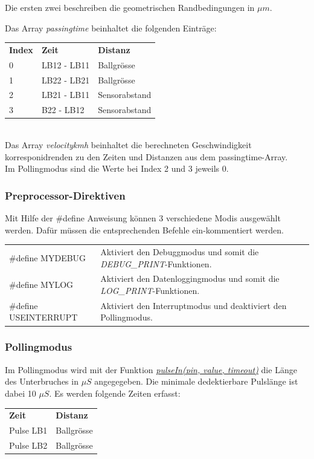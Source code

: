Die ersten zwei beschreiben die geometrischen Randbedingungen in $\mu m$.\\
\clearpage

Das Array \textit{passingtime} beinhaltet die folgenden Einträge:\\
\begin{tabular}{lll}
    \textbf{Index}&\textbf{Zeit} & \textbf{Distanz} \\
    0&LB12 - LB11 & Ballgrösse\\
    1&LB22 - LB21 & Ballgrösse\\
    2&LB21 - LB11 & Sensorabstand\\
    3&B22 - LB12 & Sensorabstand\\
\end{tabular}\\

Das Array \textit{velocitykmh} beinhaltet die berechneten Geschwindigkeit korresponidrenden zu den Zeiten und Distanzen aus dem passingtime-Array.\\
Im Pollingmodus sind die Werte bei  Index 2 und 3 jeweils 0.

\subsubsection{Preprocessor-Direktiven}
Mit Hilfe der \#define Anweisung können 3 verschiedene Modis ausgewählt werden. Dafür müssen die entsprechenden Befehle ein-kommentiert werden.\\

\begin{tabular}{L{0.3\linewidth} L{0.7\linewidth}}
    \#define MYDEBUG & Aktiviert den Debuggmodus und somit die \textit{DEBUG\_PRINT}-Funktionen.\\
    \#define MYLOG & Aktiviert den Datenloggingmodus und somit die \textit{LOG\_PRINT}-Funktionen.\\
    \#define USEINTERRUPT & Aktiviert den Interruptmodus und deaktiviert den Pollingmodus.\\
\end{tabular}

\subsubsection{Pollingmodus}
Im  Pollingmodus wird mit der Funktion \textit{\href{https://www.arduino.cc/reference/en/language/functions/advanced-io/pulsein/}{pulseIn(pin, value, timeout)}} die Länge des Unterbruches in $\mu S$ angegegeben. Die minimale dedektierbare Pulslänge ist dabei 10 $\mu S$.
Es werden folgende Zeiten erfasst:\\
\begin{tabular}{ll}
    \textbf{Zeit} & \textbf{Distanz} \\
    Pulse LB1 & Ballgrösse\\
    Pulse LB2 & Ballgrösse\\
\end{tabular}

